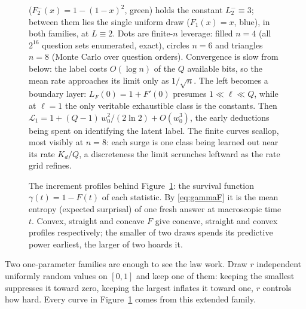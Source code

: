 \documentclass[11pt]{article}
\begin{document}
\begin{figure}[H]
{($F^-_2(x) = 1-(1-x)^2$, green) holds the constant $L^-_2 \equiv 3$;
between them lies the single uniform draw ($F_1(x) = x$, blue), in both families, at $L \equiv 2$. Dots are
finite-$n$ leverage: filled $n = 4$ (all $2^{16}$ question sets
enumerated, exact), circles $n = 6$ and triangles $n = 8$ (Monte
Carlo over question orders). Convergence is slow
from below: the label costs $O(\log n)$ of the $Q$ available bits, so
the mean rate approaches
its limit only as $1/\sqrt n$. The left becomes a boundary layer:
$L_F(0) = 1 + F'(0)$ presumes $1 \ll \ell \ll Q$, while at
$\ell = 1$ the only veritable exhaustible class is the constants.
Then $\mathcal L_1 = 1 + (Q-1)\,w_0^2/(2\ln 2) + O(w_0^3)$, the
early deductions being spent on identifying the latent label. The
finite curves scallop, most visibly at $n = 8$: each surge is
one class being learned out near its rate $K_d/Q$, a discreteness the
limit scrunches leftward as the rate grid refines.}
\label{fig:Fexamples}
\end{figure}

\begin{figure}[H]
\centering
{}
\caption{The increment profiles behind Figure~\ref{fig:Fexamples}: the survival
function $\gamma(t) = 1 - F(t)$ of each statistic. By
\eqref{eq:gammaF} it is the mean entropy (expected surprisal) of one fresh answer at
macroscopic time $t$. Convex, straight and concave $F$ give concave,
straight and convex profiles respectively; the smaller of two draws spends its
predictive power earliest, the larger of two hoards it.}
\label{fig:Fprofiles}
\end{figure}

Two one-parameter families are enough to see the law work. Draw $r$
independent uniformly random values on $[0,1]$ and keep one of them: keeping the
smallest suppresses it toward zero, keeping the largest inflates it
toward one, $r$ controls how hard. Every curve in
Figure~\ref{fig:Fexamples} comes from this extended family.
\end{document}
